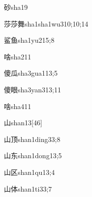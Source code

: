 \begin{verbete}{砂}{sha1}{9}
\end{verbete}

\begin{verbete}{莎莎舞}{sha1sha1wu3}{10;10;14}
\end{verbete}

\begin{verbete}{鲨鱼}{sha1yu2}{15;8}
\end{verbete}

\begin{verbete}{啥}{sha2}{11}
\end{verbete}

\begin{verbete}{傻瓜}{sha3gua1}{13;5}
\end{verbete}

\begin{verbete}{傻眼}{sha3yan3}{13;11}
\end{verbete}

\begin{verbete}{啥}{sha4}{11}
\end{verbete}

\begin{verbete}{山}{shan1}{3}[46]
\end{verbete}

\begin{verbete}{山顶}{shan1ding3}{3;8}
\end{verbete}

\begin{verbete}{山东}{shan1dong1}{3;5}
\end{verbete}

\begin{verbete}{山区}{shan1qu1}{3;4}
\end{verbete}

\begin{verbete}{山体}{shan1ti3}{3;7}
\end{verbete}

